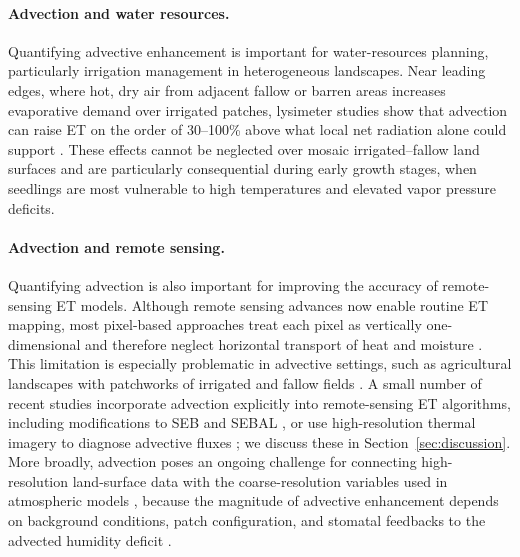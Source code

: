 \documentclass{article}
\begin{document}

\paragraph{Advection and water resources.}
Quantifying advective enhancement is important for water-resources planning, particularly irrigation management in heterogeneous landscapes.
Near leading edges, where hot, dry air from adjacent fallow or barren areas increases evaporative demand over irrigated patches, lysimeter studies show that advection can raise ET on the order of 30--100\% above what local net radiation alone could support \cite{rijks1971water, rosenberg1978extreme, spronken2000advection}.
These effects cannot be neglected over mosaic irrigated--fallow land surfaces and are particularly consequential during early growth stages, when seedlings are most vulnerable to high temperatures and elevated vapor pressure deficits.


\paragraph{Advection and remote sensing.}
Quantifying advection is also important for improving the accuracy of remote-sensing ET models.
Although remote sensing advances now enable routine ET mapping, most pixel-based approaches treat each pixel as vertically one-dimensional and therefore neglect horizontal transport of heat and moisture \cite{liou2014evapotranspiration, mcshane2017review}.
This limitation is especially problematic in advective settings, such as agricultural landscapes with patchworks of irrigated and fallow fields \cite{derardja2024advancements}.
A small number of recent studies incorporate advection explicitly into remote-sensing ET algorithms, including modifications to SEB \cite{liu2016regional} and SEBAL \cite{mkhwanazi2015sebal}, or use high-resolution thermal imagery to diagnose advective fluxes \cite{wang2024advection}; we discuss these in Section~\ref{sec:discussion}.
More broadly, advection poses an ongoing challenge for connecting high-resolution land-surface data with the coarse-resolution variables used in atmospheric models \cite{kustas_effects_2003}, because the magnitude of advective enhancement depends on background conditions, patch configuration, and stomatal feedbacks to the advected humidity deficit \cite{raupach_averaging_1982}.
\end{document}
